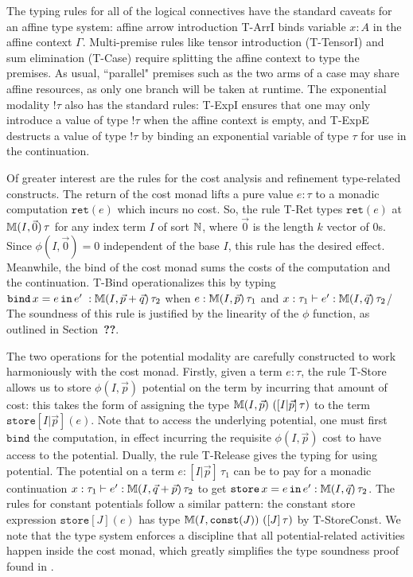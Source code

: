 The typing rules for all of the logical connectives have the standard caveats for an affine type system: affine arrow introduction T-ArrI binds variable $x : A$ in the affine context $\Gamma$. Multi-premise rules like tensor introduction (T-TensorI) and sum elimination (T-Case) require splitting the affine context to type the premises. As usual, ``parallel" premises such as the two arms of a case may share affine resources, as only one branch will be taken at runtime. The exponential modality $!\tau$ also has the standard rules: T-ExpI ensures that one may only introduce a value of type $!\tau$ when the affine context is empty, and T-ExpE destructs a value of type $!\tau$ by binding an exponential variable of type $\tau$ for use in the continuation.

Of greater interest are the rules for the cost analysis and refinement type-related constructs. The return of the cost monad lifts a pure value $e : \tau$ to a monadic computation $\texttt{ret}(e)$ which incurs no cost. So, the rule T-Ret types $\texttt{ret}(e)$ at $\mathbb{M}(I,\vec{0}) \, \tau$ for any index term $I$ of sort $\mathbb{N}$, where $\vec{0}$ is the length $k$ vector of $0$s. Since $\phi(I,\vec{0}) = 0$ independent of the base $I$, this rule has the desired effect. Meanwhile, the bind of the cost monad sums the costs of the computation and the continuation. T-Bind operationalizes this by typing $\texttt{bind}\, x = e \, \texttt{in} \, e' \; : \mathbb{M}(I,\vec{p} + \vec{q}) \, \tau_2$ when $e : \mathbb{M}(I,\vec{p}) \, \tau_1$ and $x : \tau_1 \vdash e' : \mathbb{M}(I,\vec{q}) \, \tau_2$/ The soundness of this rule is justified by the linearity of the $\phi$ function, as outlined in Section~\textbf{??}.

The two operations for the potential modality are carefully constructed to work harmoniously with the cost monad. Firstly, given a term $e : \tau$, the rule T-Store allows us to store $\phi(I,\vec{p})$ potential on the term by incurring that amount of cost: this takes the form of assigning the type $\mathbb{M}(I,\vec{p}) \, \left([I|\vec{p}] \, \tau\right)$ to the term $\texttt{store}[I|\vec{p}](e)$. Note that to access the underlying potential, one must first $\texttt{bind}$ the computation, in effect incurring the requisite $\phi(I,\vec{p})$ cost to have access to the potential. Dually, the rule T-Release gives the typing for using potential. The potential on a term $e : [I|\vec{p}] \, \tau_1$ can be to pay for a monadic continuation $x : \tau_1 \vdash e' : \mathbb{M}(I,\vec{q} + \vec{p}) \, \tau_2$ to get
$\texttt{store}\, x = e \, \texttt{in} \, e' : \mathbb{M}(I,\vec{q}) \, \tau_2$. The rules for constant potentials follow a similar pattern: the constant store expression $\texttt{store}[J](e)$ has type $\mathbb{M}(I,\texttt{const}(J)) \, \left([J] \, \tau\right)$ by T-StoreConst.
We note that the type system enforces a discipline that all potential-related activities happen inside the cost monad, which greatly simplifies the type soundness proof found in \citet{rajani-et-al:popl21}.

